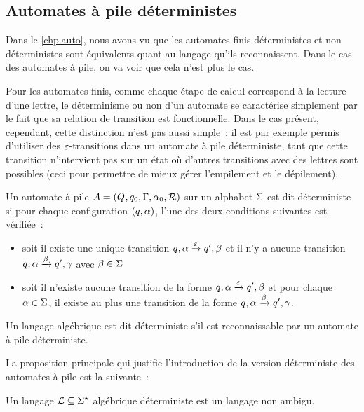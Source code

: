 \subsection{Automates à pile déterministes}

Dans le \cref{chp.auto}, nous avons vu que les automates finis déterministes et
non déterministes sont équivalents quant au langage qu'ils reconnaissent. Dans
le cas des automates à pile, on va voir que cela n'est plus le cas.

Pour les automates finis, comme chaque étape de calcul correspond à la lecture
d'une lettre, le déterminisme ou non d'un automate se caractérise simplement par
le fait que sa relation de transition est fonctionnelle. Dans le cas présent,
cependant, cette distinction n'est pas aussi simple~: il est par exemple permis
d'utiliser des $\varepsilon$-transitions dans un automate à pile déterministe, tant que
cette transition n'intervient pas sur un état où d'autres transitions avec des
lettres sont possibles (ceci pour permettre de mieux gérer l'empilement et le
dépilement).

\begin{definition}
  Un automate à pile $\mathcal{A} = (Q_{},q_{0},\Gamma,\alpha_0,\mathrel{\mathcal{R}})$ sur un
  alphabet $\Sigma$ est dit déterministe si pour chaque configuration
  $(q_{},\alpha)$, l'une des deux conditions suivantes est vérifiée~:
  \begin{itemize}
  \item soit il existe une unique transition
    $q_{},\alpha\xrightarrow{\varepsilon} q_{}',\beta$ et il n'y a aucune transition
    $q_{},\alpha\xrightarrow{\beta} q_{}',\gamma$ avec $\beta \in \Sigma$
  \item soit il n'existe aucune transition de la forme
    $q_{},\alpha\xrightarrow{\varepsilon} q_{}',\beta$ et pour chaque
    $\alpha \in \Sigma$, il existe au plus une transition de la forme
    $q_{},\alpha\xrightarrow{\beta} q_{}',\gamma$.
  \end{itemize}

  Un langage algébrique est dit déterministe s'il est reconnaissable par un
  automate à pile déterministe.
\end{definition}

La proposition principale qui justifie l'introduction de la version déterministe
des automates à pile est la suivante~:

\begin{proposition}
  Un langage $\mathcal L\subseteq \Sigma^{\star}$ algébrique déterministe est un langage non
  ambigu.
\end{proposition}

